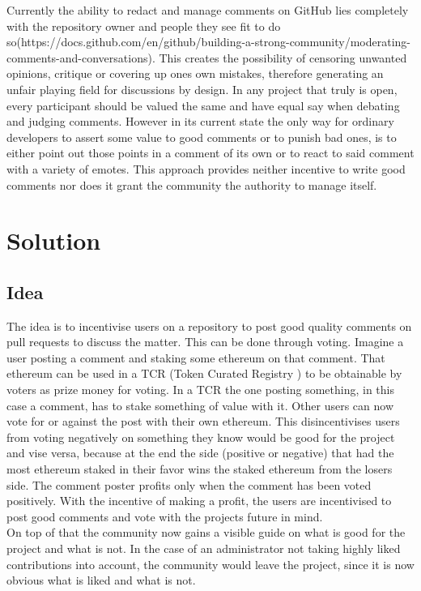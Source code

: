 \documentclass[sigconf]{acmart}
\begin{document}
Currently the ability to redact and manage comments on GitHub lies completely with the repository owner and people they see fit to do so(https://docs.github.com/en/github/building-a-strong-community/moderating-comments-and-conversations). This creates the possibility of censoring unwanted opinions, critique or covering up ones own mistakes, therefore generating an unfair playing field for discussions by design. In any project that truly is open, every participant should be valued the same and have equal say when debating and judging comments.
However in its current state the only way for ordinary developers to assert some value to good comments or to punish bad ones, is to either point out those points in a comment of its own or to react to said comment with a variety of emotes. This approach provides neither incentive to write good comments nor does it grant the community the authority to manage itself.


\section{Solution}

\subsection{Idea}

The idea is to incentivise users on a repository to post good quality comments on pull requests to discuss the matter.
This can be done through voting. Imagine a user posting a comment and staking some ethereum on that comment. That ethereum can be used in a TCR (Token Curated Registry \cite{medium1}) to be obtainable by voters as prize money for voting. In a TCR the one posting something, in this case a comment, has to stake something of value with it. Other users can now vote for or against the post with their own ethereum. This disincentivises users from voting negatively on something they know would be good for the project and vise versa, because at the end the side (positive or negative) that had the most ethereum staked in their favor wins the staked ethereum from the losers side. The comment poster profits only when the comment has been voted positively.
With the incentive of making a profit, the users are incentivised to post good comments and vote with the projects future in mind.\\

On top of that the community now gains a visible guide on what is good for the project and what is not. In the case of an administrator not taking highly liked contributions into account, the community would leave the project, since it is now obvious what is liked and what is not.
\end{document}
